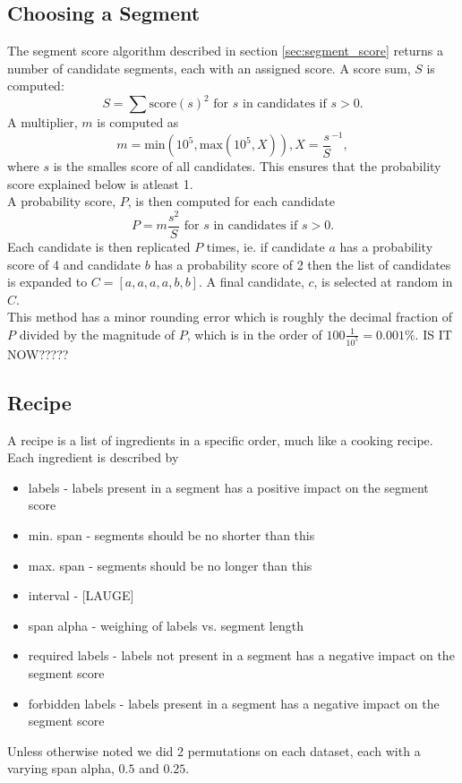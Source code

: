 \subsection{Choosing a Segment}
%
The segment score algorithm described in section \ref{sec:segment_score} returns a number of candidate segments, each with an assigned score. A score sum, $S$ is computed:
\[
S = \sum{\text{score}(s)^2 \text{ for } s \text{ in candidates if } s > 0}.
\]
A multiplier, $m$ is computed as
\[
m = \text{min}(10^5, \text{max}(10^5, X)), X = \frac{s}{S}^{-1},
\] %
where $s$ is the smalles score of all candidates. This ensures that the probability score explained below is atleast 1.\\
A probability score, $P$, is then computed for each candidate 
\[
P = m \frac{s^2}{S} \text{ for } s \text{ in candidates if } s > 0.
\] %
Each candidate is then replicated $P$ times, ie. if candidate $a$ has a probability score of 4 and candidate $b$ has a probability score of 2 then the list of candidates is expanded to $C = [a,a,a,a,b,b]$. A final candidate, $c$, is selected at random in $C$.\\
This method has a minor rounding error which is roughly the decimal fraction of $P$ divided by the magnitude of $P$, which is in the order of $100\frac{1}{10^5} = 0.001\%$. IS IT NOW?????
%
\subsection{Recipe}
%
A recipe is a list of ingredients in a specific order, much like a cooking recipe. Each ingredient is described by
\begin{itemize}
\item labels - labels present in a segment has a positive impact on the segment score
\item min. span - segments should be no shorter than this
\item max. span - segments should be no longer than this
\item interval - [LAUGE]
\item span alpha - weighing of labels vs. segment length
\item required labels - labels not present in a segment has a negative impact on the segment score
\item forbidden labels - labels present in a segment has a negative impact on the segment score
\end{itemize}
Unless otherwise noted we did 2 permutations on each dataset, each with a varying span alpha, $0.5$ and $0.25$.
%
